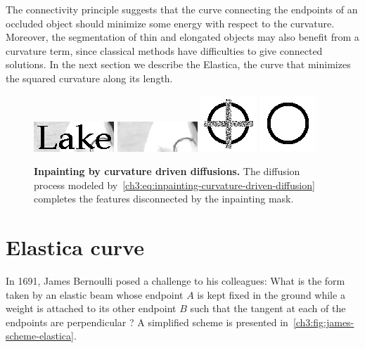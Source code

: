 The connectivity principle suggests that the curve connecting the endpoints of an occluded object should minimize some energy with respect to the curvature. Moreover, the segmentation of thin and elongated objects may also benefit from a curvature term, since classical methods have difficulties to give connected solutions. In the next section we describe the Elastica, the curve that minimizes the squared curvature along its length.

\begin{figure}
\center
\includegraphics[scale=1]{figures/chapter3/inpainting-cdd/lake-1.png}\hspace{0.5em}
\includegraphics[scale=1]{figures/chapter3/inpainting-cdd/lake-2.png}\hspace{3em}
\includegraphics[scale=0.6]{figures/chapter3/inpainting-cdd/circle-1.png}\hspace{0.5em}
\includegraphics[scale=0.6]{figures/chapter3/inpainting-cdd/circle-2.png}
\caption{\textbf{Inpainting by curvature driven diffusions.}\cite{chan01nontexture} The diffusion process modeled by~\cref{ch3:eq:inpainting-curvature-driven-diffusion} completes the features disconnected by the inpainting mask.}
\label{ch3:fig:inpainting-curvature-driven-diffusion}
\end{figure}



\section{Elastica curve}
\label{ch3:sec:elastica-curve}

In 1691, James Bernoulli posed a challenge to his colleagues: What is the form taken by an elastic beam whose endpoint $A$ is kept fixed in the ground while a weight is attached to its other endpoint $B$ such that the tangent at each of the endpoints are perpendicular ? A simplified scheme is presented in~\cref{ch3:fig:james-scheme-elastica}.

